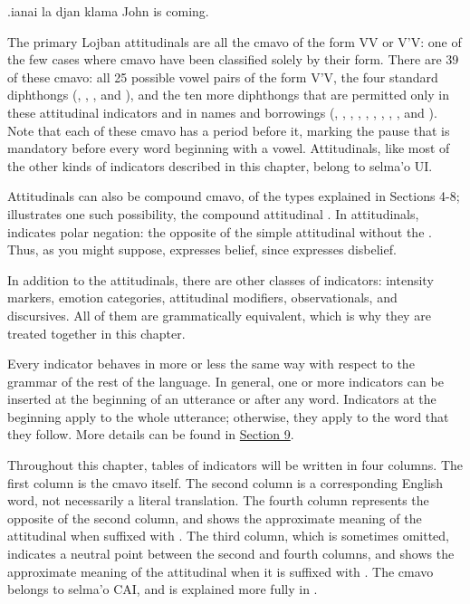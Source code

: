 \begin{example}
.ianai la djan klama\n
{} John is coming.
\end{example}

The primary Lojban attitudinals are all the cmavo of the form
    VV or V'V: one of the few cases where cmavo have been
    classified solely by their form. There are 39 of these cmavo:
    all 25 possible vowel pairs of the form V'V, the four standard
    diphthongs (, , , and ), and the
    ten more diphthongs that are permitted only in these
    attitudinal indicators and in names and borrowings (,
    , , , , , , ,
    , and ). Note that each of these cmavo has a
    period before it, marking the pause that is mandatory before
    every word beginning with a vowel. Attitudinals, like most of
    the other kinds of indicators described in this chapter, belong
    to selma'o UI. 

Attitudinals can also be compound cmavo, of the types
    explained in Sections 4-8; 
    illustrates one such possibility, the compound attitudinal
    . In attitudinals,  indicates polar negation:
    the opposite of the simple attitudinal without the .
    Thus, as you might suppose,  expresses belief, since
     expresses disbelief.

In addition to the attitudinals, there are other classes of
    indicators: intensity markers, emotion categories, attitudinal
    modifiers, observationals, and discursives. All of them are
    grammatically equivalent, which is why they are treated
    together in this chapter.

Every indicator behaves in more or less the same way with
    respect to the grammar of the rest of the language. In general,
    one or more indicators can be inserted at the beginning of an
    utterance or after any word. Indicators at the beginning apply
    to the whole utterance; otherwise, they apply to the word that
    they follow. More details can be found in \hyperref[sec:13:9]{Section
    9}.

Throughout this chapter, tables of indicators will be
    written in four columns. The first column is the cmavo itself.
    The second column is a corresponding English word, not
    necessarily a literal translation. The fourth column represents
    the opposite of the second column, and shows the approximate
    meaning of the attitudinal when suffixed with . The
    third column, which is sometimes omitted, indicates a neutral
    point between the second and fourth columns, and shows the
    approximate meaning of the attitudinal when it is suffixed with
    . The cmavo  belongs to selma'o CAI, and is
    explained more fully in .

